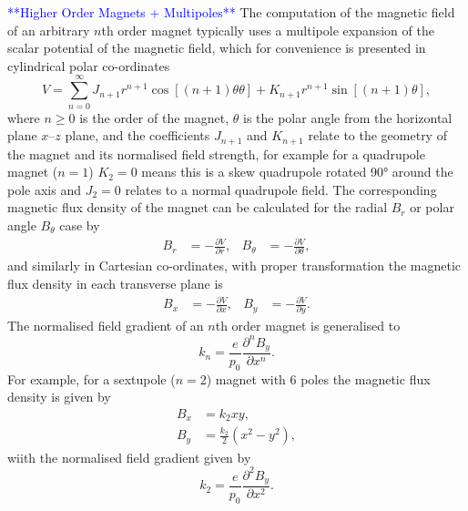 \documentclass[../main.tex]{subfiles}
\begin{document}
\textcolor{blue}{**Higher Order Magnets + Multipoles**}
The computation of the magnetic field of an arbitrary $n$th order magnet typically uses a multipole expansion of the scalar potential of the magnetic field, which for convenience is presented in cylindrical polar co-ordinates \cite{shepherd2016magnet}
\begin{equation}
V = \sum_{n=0}^{\infty} J_{n+1}r^{n+1}\cos\left[\left(n+1\right)\theta\theta\right]+K_{n+1}r^{n+1}\sin\left[\left(n+1\right)\theta\right],
\label{eq:multipole_scalar_potential}    
\end{equation}
where $n \geq 0$ is the order of the magnet, $\theta$ is the polar angle from the horizontal plane  $x$--$z$ plane, and the coefficients $J_{n+1}$ and $K_{n+1}$ relate to the geometry of the magnet and its normalised field strength, for example for a quadrupole magnet ($n=1$) $K_{2}=0$ means this is a skew quadrupole rotated 90\si{\degree} around the pole axis and $J_{2}=0$ relates to a normal quadrupole field. The corresponding magnetic flux density of the magnet can be calculated for the radial $B_{r}$ or polar angle $B_{\theta}$ case by    
\begin{align}
B_{r} &= -\frac{\partial V}{\partial r}, & B_{\theta} &= -\frac{\partial V}{\partial \theta},
\label{eq:multipole_magnetic_field_cylindrical}    
\end{align}
and similarly in Cartesian co-ordinates, with proper transformation the magnetic flux density in each transverse plane is
\begin{align}
B_{x} &= -\frac{\partial V}{\partial x}, & B_{y} &= -\frac{\partial V}{\partial y}.
\label{eq:multipole_magnetic_field_cartesian}
\end{align}
The normalised field gradient of an $n$th order magnet is generalised to
\begin{equation}
k_{n} = \frac{e}{p_{0}}\frac{\partial^{n} B_{y}}{\partial x^{n}}.
\label{eq:multipole_normalised_field_gradient}    
\end{equation}
For example, for a sextupole ($n=2$) magnet with 6 poles the magnetic flux density is given by
\begin{align}
B_{x} &= k_{2}xy, \nonumber \\
B_{y} &= \frac{k_{2}}{2}\left(x^{2}-y^{2}\right),
\label{eq:sextupole_magnetic_field}    
\end{align}
wiith the normalised field gradient given by 
\begin{equation}
k_{2} = \frac{e}{p_{0}}\frac{\partial^{2}B_{y}}{\partial x^{2}}.
\label{eq:sextupole_field_gradient}    
\end{equation}
\end{document}
